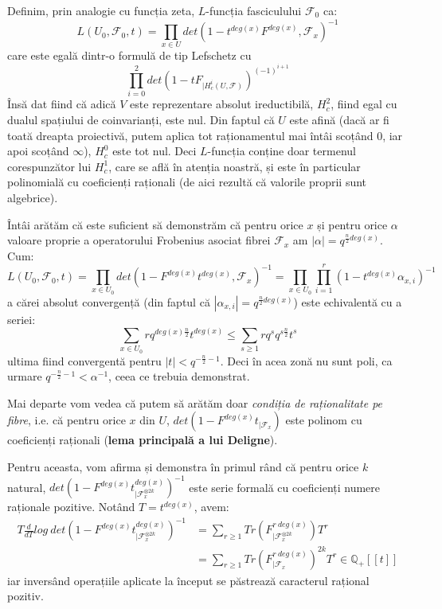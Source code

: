 \documentclass[13pt,openany]{book}
\begin{document}
Definim, prin analogie cu funcția zeta, $L$-funcția fasciculului $\mathcal{F}_0$ ca:
$$L(U_0,\mathcal{F}_0,t)=\prod\limits_{x \in U} det(1-t^{deg(x)}F^{deg(x)}, \mathcal{F}_x)^{-1}$$
care este egală dintr-o formulă de tip Lefschetz cu
$$\prod\limits_{i=0}^2 det(1-tF_{\mid H^i_c(U,\mathcal{F})})^{(-1)^{i+1}}$$
Însă dat fiind că adică $V$ este reprezentare absolut ireductibilă, $H^2_c$, fiind egal cu dualul spațiului de coinvarianți, este nul. Din faptul că $U$ este afină (dacă ar fi toată dreapta proiectivă, putem aplica tot raționamentul mai întâi scoțând $0$, iar apoi scoțând $\infty$), $H^0_c$ este tot nul. Deci $L$-funcția conține doar termenul corespunzător lui $H^1_c$, care se află în atenția noastră, și este în particular polinomială cu coeficienți raționali (de aici rezultă că valorile proprii sunt algebrice).

Întâi arătăm că este suficient să demonstrăm că pentru orice $x$ și pentru orice $\alpha$ valoare proprie a operatorului Frobenius asociat fibrei $\mathcal{F}_x$ am $|\alpha|=q^{\frac{n}{2} deg(x)}$. Cum:
$$L(U_0,\mathcal{F_0},t)=\prod\limits_{x\in U_0} det(1-F^{deg(x)}t^{deg(x)},\mathcal{F}_x)^{-1} = \prod\limits_{x\in U_0} \prod\limits_{i=1}^r (1-t^{deg(x)}\alpha_{x,i})^{-1}$$
a cărei absolut convergență (din faptul că $|\alpha_{x,i}|=q^{\frac{n}{2} deg(x)}$) este echivalentă cu a seriei:
$$\sum\limits_{x\in U_0} rq^{deg(x)\frac{n}{2}}t^{deg(x)} \leq \sum\limits_{s\geq 1} rq^s q^{s\frac{n}{2}} t^s$$
ultima fiind convergentă pentru $|t|<q^{-\frac{n}{2}-1}$.
Deci în acea zonă nu sunt poli, ca urmare $q^{-\frac{n}{2}-1}<\alpha^{-1}$, ceea ce trebuia demonstrat.

Mai departe vom vedea că putem să arătăm doar {\it condiția de raționalitate pe fibre}, i.e. că pentru orice $x$ din $U$, $det(1-F^{deg(x)}t_{\mid\mathcal{F}_x})$ este polinom cu coeficienți raționali ({\bf lema principală a lui Deligne}).

Pentru aceasta, vom afirma și demonstra în primul rând că pentru orice $k$ natural, $det(1-F^{deg(x)}t^{deg(x)}_{\mid\mathcal{F}^{\otimes 2k}_x})^{-1}$ este serie formală cu coeficienți numere raționale pozitive. Notând $T=t^{deg(x)}$, avem:
\begin{align*}
T\frac{d}{dT}log\ det(1-F^{deg(x)}t^{deg(x)}_{\mid\mathcal{F}^{\otimes 2k}_x})^{-1}&=\sum\limits_{r\geq 1} Tr(F^{r\ deg(x)}_{\mid\mathcal{F}^{\otimes 2k}_x})T^r\\
&= \sum\limits_{r\geq 1} Tr(F^{r\ deg(x)}_{\mid\mathcal{F}_x})^{2k} T^r \in \mathbb{Q}_+[[t]]
\end{align*}
iar inversând operațiile aplicate la început se păstrează caracterul rațional pozitiv.
\end{document}
